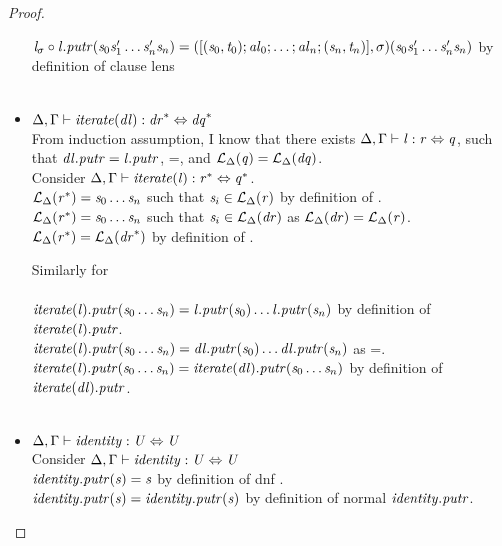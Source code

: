 \begin{lemma}
\begin{proof}
\begin{itemize}
$\mathit{l}_{\sigma} \circ \mathit{l}\mathit{.putr}(\mathit{s}_0\mathit{s}_1'\ldots\mathit{s}_n'\mathit{s}_n)=([(\mathit{s}_0,\mathit{t}_0);\mathit{al}_0;\ldots;\mathit{al}_n;(\mathit{s}_n,\mathit{t}_n)],\sigma)(\mathit{s}_0\mathit{s}_1'\ldots\mathit{s}_n'\mathit{s}_n)$ by definition of clause lens\\
\\
\item$\Delta, \Gamma \vdash \mathit{iterate(\mathit{dl})} : \mathit{dr}^* \Leftrightarrow \mathit{dq}^*$\\
From induction assumption, I know that there exists $\Delta, \Gamma \vdash \mathit{l} : \mathit{r} \Leftrightarrow \mathit{q}$, such that
$\mathit{dl}\mathit{.putr}=\mathit{l}\mathit{.putr}$,
\LanguageOf{\RegexContext}{\Regex}=\LanguageOf{\RegexContext}{\DNFRegex}, and
$\mathcal{L}_{\Delta}(\mathit{q})=\mathcal{L}_{\Delta}(\mathit{dq})$.\\
Consider $\Delta, \Gamma \vdash \mathit{iterate(\mathit{l})} : \mathit{r}^* \Leftrightarrow \mathit{q}^*$.\\
$\mathcal{L}_{\Delta}(\mathit{r}^*) = \mathit{s}_0\ldots\mathit{s}_n$ such that $\mathit{s}_i \in \mathcal{L}_{\Delta}(\mathit{r})$ by definition of \LanguageOf{\Delta}{\Star{\Regex}}.\\
$\mathcal{L}_{\Delta}(\mathit{r}^*) = \mathit{s}_0\ldots\mathit{s}_n$ such that $\mathit{s}_i \in \mathcal{L}_{\Delta}(\mathit{dr})$ as $\mathcal{L}_{\Delta}(\mathit{dr})=\mathcal{L}_{\Delta}(\mathit{r})$.\\
$\mathcal{L}_{\Delta}(\mathit{r}^*) = \mathcal{L}_{\Delta}(\mathit{dr}^*)$ by definition of \LanguageOf{\RegexContext}{\Star{\DNFRegex}}.

Similarly for \LanguageOf{\RegexContext}{\Star{\RegexAlt}}\\\\
$\mathit{iterate(\mathit{l})}\mathit{.putr}(\mathit{s}_0\ldots\mathit{s}_n)=\mathit{l}\mathit{.putr}(\mathit{s}_0)\ldots\mathit{l}\mathit{.putr}(\mathit{s}_n)$ by definition of $\mathit{iterate(\mathit{l})}\mathit{.putr}$.\\
$\mathit{iterate(\mathit{l})}\mathit{.putr}(\mathit{s}_0\ldots\mathit{s}_n)=\mathit{dl}\mathit{.putr}(\mathit{s}_0)\ldots\mathit{dl}\mathit{.putr}(\mathit{s}_n)$ as \PutRight{\DNFLens}=\PutRight{\Lens}.\\
$\mathit{iterate(\mathit{l})}\mathit{.putr}(\mathit{s}_0\ldots\mathit{s}_n)=\mathit{iterate(\mathit{dl})}\mathit{.putr}(\mathit{s}_0\ldots\mathit{s}_n)$ by definition of $\mathit{iterate(\mathit{dl})}\mathit{.putr}$.\\
\\
\item$\Delta, \Gamma \vdash \mathit{identity} : \mathit{U} \Leftrightarrow \mathit{U}$\\
Consider $\Delta, \Gamma \vdash \mathit{identity} : \mathit{U} \Leftrightarrow \mathit{U}$\\
$\mathit{identity}\mathit{.putr}(\mathit{s})=\mathit{s}$ by definition of dnf \PutRight{\IdentityLens{}}.\\
$\mathit{identity}\mathit{.putr}(\mathit{s})=\mathit{identity}\mathit{.putr}(\mathit{s})$ by definition of normal $\mathit{identity}{}\mathit{.putr}$.
\end{itemize}
\end{proof}
\end{lemma}

